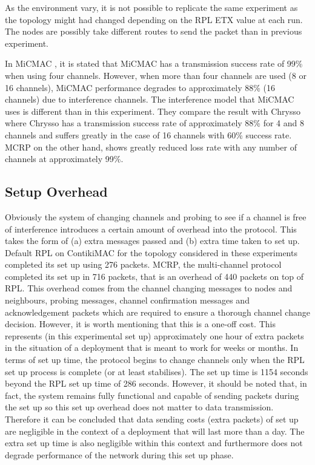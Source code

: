 As the environment vary, it is not possible to replicate the same experiment as the topology might had changed depending on the RPL ETX value at each run. The nodes are possibly take different routes to send the packet than in previous experiment.

In MiCMAC \cite{micmac}, it is stated that MiCMAC has a transmission success rate of 99\% when using four channels. However, when more than four channels are used (8 or 16 channels), MiCMAC performance degrades to approximately 88\% (16 channels) due to interference channels. The interference model that MiCMAC uses is different than in this experiment. They compare the result with Chrysso where Chrysso has a transmission success rate of approximately 88\% for 4 and 8 channels and suffers greatly in the case of 16 channels with 60\% success rate.
MCRP on the other hand, shows greatly reduced loss rate with any number of channels at approximately 99\%.

\subsection{Setup Overhead}
Obviously the system of changing channels and probing to see if a channel is free of interference introduces a certain amount of overhead into
the protocol. This takes the form of (a) extra messages passed and (b) extra time taken to set up. Default RPL on ContikiMAC for the topology considered in these experiments completed its set up using 276 packets. MCRP, the multi-channel protocol completed its set up in 716 packets, that is an overhead of 440 packets on top of RPL. 
This overhead comes from the channel changing messages to nodes and neighbours, probing messages, channel confirmation messages and acknowledgement packets which are required to ensure a thorough channel change decision.
However, it is worth mentioning that this is a one-off cost. This represents (in this experimental set up) approximately one hour of extra packets in the situation of a deployment that is meant to work for weeks or months.  In terms of set up time, the protocol begins to change channels only when the RPL set up process is complete (or at least stabilises). The set up time is 1154 seconds beyond the RPL set up time of 286 seconds. However, it should be noted that, in fact, the system remains fully functional and capable of sending packets during the set up so this set up overhead does not matter to data transmission.
Therefore it can be concluded that data sending costs (extra packets) of set up are negligible in the context of a deployment that will last more than a day. The extra set up time is also negligible within this context and furthermore does not degrade performance of the network during this set up phase.